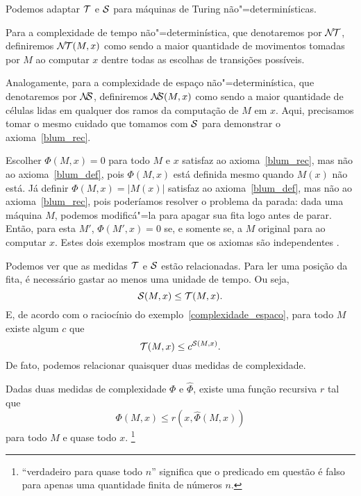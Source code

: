 \begin{example}
    \label{complexidade_nao_deterministica}
    Podemos adaptar ${\mathcal{T}}$ e ${\mathcal{S}}$
    para máquinas de Turing não"=determinísticas.

    Para a complexidade de tempo não"=determinística,
    que denotaremos por ${\mathcal{N\!T}}$,
    definiremos ${\mathcal{N\!T}}(M, x)$
    como sendo a maior quantidade de movimentos
    tomadas por $M$ ao computar $x$
    dentre todas as escolhas de transições possíveis.

    Analogamente,
    para a complexidade de espaço não"=determinística,
    que denotaremos por ${\mathcal{N\!\!S}}$,
    definiremos ${\mathcal{N\!\!S}}(M, x)$
    como sendo a maior quantidade de células lidas
    em qualquer dos ramos da computação de $M$ em $x$.
    Aqui, precisamos tomar o mesmo cuidado que tomamos
    com ${\mathcal{S}}$ para demonstrar o axioma~\ref{blum_rec}.
\end{example}

\begin{example}
    Escolher $\Phi(M, x) = 0$ para todo $M$ e $x$
    satisfaz ao axioma~\ref{blum_rec},
    mas não ao axioma~\ref{blum_def},
    pois $\Phi(M, x)$ está definida mesmo quando $M(x)$ não está.
    Já definir $\Phi(M, x) = |M(x)|$
    satisfaz ao axioma~\ref{blum_def},
    mas não ao axioma~\ref{blum_rec},
    pois poderíamos resolver o problema da parada:
    dada uma máquina $M$, podemos modificá"=la
    para apagar sua fita logo antes de parar.
    Então, para esta $M'$,
    $\Phi(M', x) = 0$ se, e somente se,
    a $M$ original para ao computar $x$.
    Estes dois exemplos mostram que os axiomas são independentes
    \cite[p.~3]{Blum1967}.
\end{example}

Podemos ver que as medidas ${\mathcal{T}}$ e ${\mathcal{S}}$ estão relacionadas.
Para ler uma posição da fita,
é necessário gastar ao menos uma unidade de tempo.
Ou seja,
\begin{equation*}
    {\mathcal{S}}(M, x) \leq {\mathcal{T}}(M, x).
\end{equation*}
E, de acordo com o raciocínio do exemplo~\ref{complexidade_espaco},
para todo $M$ existe algum $c$ que
\begin{equation*}
    {\mathcal{T}}(M, x) \leq c^{{\mathcal{S}}(M, x)}.
\end{equation*}
De fato, podemos relacionar quaisquer duas medidas de complexidade.

\begin{theorem}
    \label{relacao_medidas}
    Dadas duas medidas de complexidade $\Phi$ e $\hat \Phi$,
    existe uma função recursiva $r$ tal que
    \begin{equation*}
        \Phi(M, x) \leq r( x, \hat \Phi(M, x))
    \end{equation*}
    para todo $M$ e quase todo $x$.
    \footnote{
        ``verdadeiro para quase todo $n$''
        significa que o predicado em questão
        é falso para apenas uma quantidade finita de números $n$.
    }
\end{theorem}


